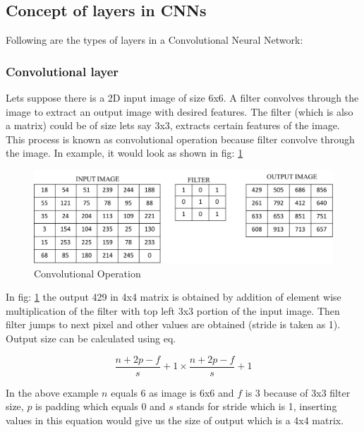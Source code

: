 \documentclass[11pt]{article}
\begin{document}
\subsection{Concept of layers in CNNs}
Following are the types of layers in a Convolutional Neural Network:

\subsubsection{Convolutional layer}
Lets suppose there is a 2D input image of size 6x6. A filter convolves through the image to extract an output image with desired features. The filter (which is also a matrix) could be of size lets say 3x3, extracts certain features of the image. This process is known as convolutional operation because filter convolve through the image. In example, it would look as shown in fig: \ref{fig:Convolutional Operation}

\begin{figure}[H]
	\includegraphics[width=\linewidth]{files/cnn_architecture/conv.png}
	\caption{Convolutional Operation}
	\label{fig:Convolutional Operation}
\end{figure}

In fig: \ref{fig:Convolutional Operation} the output 429 in 4x4 matrix is obtained by addition of element wise multiplication of the filter with top left 3x3 portion of the input image. Then filter jumps to next pixel and other values are obtained (stride is taken as 1). Output size can be calculated using eq.

\begin{equation}
\frac{n+2p-f}{s}+1 \times \frac{n+2p-f}{s}+1
\end{equation}

In the above example $n$ equals 6 as image is 6x6 and $f$ is 3 because of 3x3 filter size, $p$ is padding which equals 0 and $s$ stands for stride which is 1, inserting values in this equation would give us the size of output which is a 4x4 matrix.
\end{document}
